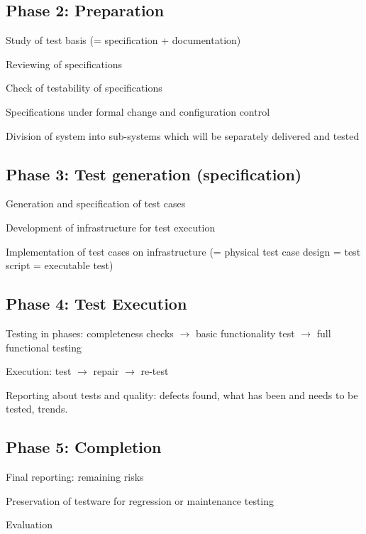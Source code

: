 \subsection{Phase 2: Preparation}
\begin{itemize*}
    \item Study of test basis (= specification + documentation)
    \item Reviewing of specifications
    \item Check of testability of specifications
    \item Specifications under formal change and configuration control
    \item Division of system into sub-systems which will be separately delivered and tested
\end{itemize*}

\subsection{Phase 3: Test generation (specification)}
\begin{itemize*}
    \item Generation and specification of test cases
    \item Development of infrastructure for test execution
    \item Implementation of test cases on infrastructure (= physical test case design = test script = executable test)
\end{itemize*}

\subsection{Phase 4: Test Execution}
\begin{itemize*}
    \item Testing in phases: completeness checks $\to$ basic functionality test $\to$ full functional testing
    \item Execution: test $\to$ repair $\to$ re-test
    \item Reporting about tests and quality: defects found, what has been and needs to be tested, trends.
\end{itemize*}

\subsection{Phase 5: Completion}
\begin{itemize*}
    \item Final reporting: remaining risks
    \item Preservation of testware for regression or maintenance testing
    \item Evaluation
\end{itemize*}

